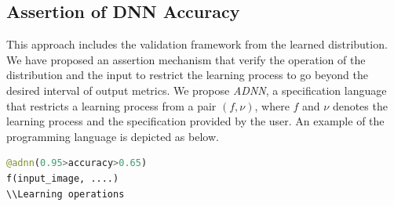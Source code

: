 \subsection{Assertion of DNN Accuracy}
This approach includes the validation framework from the learned distribution. We have proposed an assertion mechanism that verify the operation of the distribution and the input to restrict the learning process to go beyond the desired interval of output metrics. We propose \emph{ADNN}, a specification language that restricts a learning process from a pair $(f,\nu)$, where $f$ and $\nu$ denotes the learning process and the specification provided by the user. An example of the programming language is depicted as below.
\begin{lstlisting}[language=Python, caption=Example of specification language]
@adnn(0.95>accuracy>0.65)
f(input_image, ....)
\\Learning operations
\end{lstlisting}